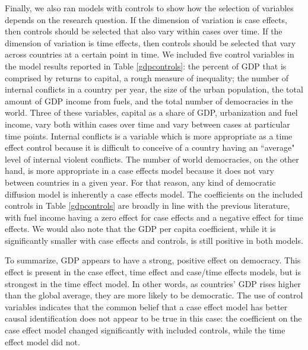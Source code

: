 \documentclass{article}[12pt]
\begin{document}
Finally, we also ran models with controls to show how the selection of variables depends on the research question. If the dimension of variation is case effects, then controls should be selected that also vary within cases over time. If the dimension of variation is time effects, then controls should be selected that vary across countries at a certain point in time. We included five control variables in the model results reported in Table \ref{gdpcontrols}: 	the percent of GDP that is comprised by returns to capital, a rough measure of inequality; the number of internal conflicts in a country per year, the size of the urban population, the total amount of GDP income from fuels, and the total number of democracies in the world. Three of these variables, capital as a share of GDP, urbanization and fuel income, vary both within cases over time and vary between cases at particular time points. Internal conflicts is a variable which is more appropriate as a time effect control because it is difficult to conceive of a country having an ``average" level of internal violent conflicts. The number of world democracies, on the other hand, is more appropriate in a case effects model because it does not vary between countries in a given year. For that reason, any kind of democratic diffusion model is inherently a case effects model. The coefficients on the included controls in Table \ref{gdpcontrols} are broadly in line with the previous literature, with fuel income having a zero effect for case effects and a negative effect for time effects. We would also note that the GDP per capita coefficient, while it is significantly smaller with case effects and controls, is still positive in both models.

To summarize, GDP appears to have a strong, positive effect on democracy. This effect is present in the case effect, time effect and case/time effects models, but is strongest in the time effect model. In other words, as countries' GDP rises higher than the global average, they are more likely to be democratic. The use of control variables indicates that the common belief that a case effect model has better causal identification does not appear to be true in this case: the coefficient on the case effect model changed significantly with included controls, while the time effect model did not.






	
\end{document}
